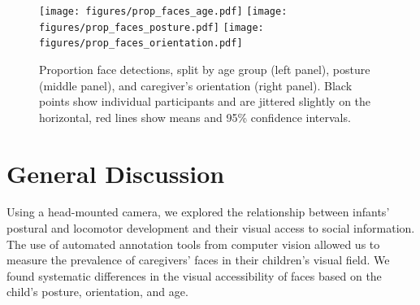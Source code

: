 \documentclass[10pt,letterpaper]{article}
\begin{document}




\begin{figure}[t]
\texttt{[image: figures/prop\_faces\_age.pdf]}
\texttt{[image: figures/prop\_faces\_posture.pdf]}
\texttt{[image: figures/prop\_faces\_orientation.pdf]}
\caption{\label{fig:face_dets} Proportion face detections, split by age group (left panel), posture (middle panel), and caregiver's orientation (right panel). Black points show individual participants and are jittered slightly on the horizontal, red lines show means and 95\% confidence intervals.} 
\end{figure}



\section{General Discussion}


Using a head-mounted camera, we explored the relationship between infants' postural and locomotor development and their visual access to social information. The use of automated annotation tools from computer vision allowed us to measure the prevalence of caregivers' faces in their children's visual field. We found systematic differences in the visual accessibility of faces based on the child's posture, orientation, and age. 
\end{document}
